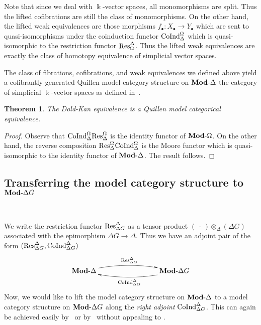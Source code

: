 \documentclass[a4paper,11pt]{amsart}
\newtheorem{theorem}{Theorem}[section]
\theoremstyle{definition}
\newcommand{\rmod}[1]{\text{{\bf Mod}-}{#1}}
\newcommand{\Res}{\text{\rm Res}}
\newcommand{\CoInd}{\text{\rm CoInd}}
\newcommand{\Simp}{{\Delta}}
\newcommand{\Diff}{{\Omega}}
\begin{document}
Note that since we deal with $\Bbbk$-vector spaces, all monomorphisms are split. Thus the lifted cofibrations are still the class of monomorphisms. On the other hand, the lifted weak equivalences are those morphisms $f_\bullet\colon X_\bullet\to Y_\bullet$ which are sent to quasi-isomorphisms under the coinduction functor $\CoInd_{\Simp}^\Diff$ which is quasi-isomorphic to the restriction functor $\Res^{\Simp}_\Diff$. Thus the lifted weak equivalences are exactly the class of homotopy equivalence of simplicial vector spaces. 

The class of fibrations, cofibrations, and weak equivalences we defined above yield a cofibrantly generated Quillen model category structure on $\rmod{\Simp}$ the category of simplicial $\Bbbk$-vector spaces as defined in~\cite{jardine_2003,SchwedeShipley03}.

\begin{theorem}
    The Dold-Kan equivalence is a Quillen model categorical equivalence.
\end{theorem}

\begin{proof}
Observe that $\CoInd_{\Simp}^\Diff\Res_{\Simp}^\Diff$ is the identity functor of $\rmod{\Diff}$. On the other hand, the reverse composition $\Res_{\Simp}^\Diff\CoInd_{\Simp}^\Diff$ is the Moore functor which is quasi-isomorphic to the identity functor of $\rmod{\Simp}$. The result follows.
\end{proof}

\subsection{Transferring the model category structure to $\rmod{\Simp G}$}~

We write the restriction functor $\Res_{\Simp G}^\Simp$ as a tensor product $(\ \cdot\ )\otimes_{\Simp} (\Simp G)$ associated with the epimorphism $\Simp G\to \Simp$.  Thus we have an adjoint pair of the form $(\Res_{\Simp G}^\Simp, \CoInd_{\Simp G}^\Simp)$
\[ \xymatrix{
    \rmod{\Simp} \ar@/^{2ex}/[rrr]^{\Res_{\Simp G}^\Simp} &&& 
    \ar@/^{2ex}/[lll]^{\CoInd_{\Simp G}^\Simp} \rmod{\Simp G} 
  }  \]  
Now, we would like to lift the model category structure on $\rmod{\Simp}$ to a model category structure on $\rmod{\Simp G}$ along the \emph{right adjoint} $\CoInd_{\Simp G}^\Simp$. This can again be achieved easily by~\cite[Theorems 11.3.1 and 11.3.2]{hirschhorn2009model} or by~\cite[Thm.7.44]{heuts_simplicial_2022} without appealing to \cite{hess2015, hess2017necessary}. 
\end{document}
